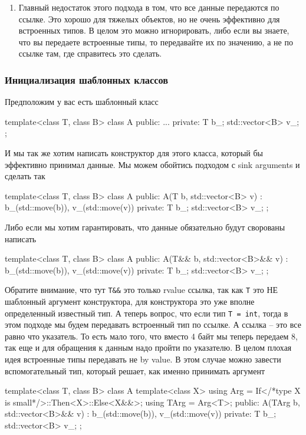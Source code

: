 \begin{enumerate}
\item Главный недостаток этого подхода в том, что все данные передаются по ссылке.
Это хорошо для тяжелых объектов, но не очень эффективно для встроенных типов.
В целом это можно игнорировать, либо если вы знаете, что вы передаете встроенные типы, то передавайте их по значению, а не по ссылке там, где справитесь это сделать.
\end{enumerate}


\subsubsection{Инициализация шаблонных классов}

Предположим у вас есть шаблонный класс
\begin{cppcode}
template<class T, class B>
class A {
public:
  ...
private:
  T b_;
  std::vector<B> v_;
};
\end{cppcode}
И мы так же хотим написать конструктор для этого класса, который бы эффективно принимал данные.
Мы можем обойтись подходом с sink arguments и сделать так
\begin{cppcode}
template<class T, class B>
class A {
public:
  A(T b, std::vector<B> v)
   : b_(std::move(b)), v_(std::move(v)) {}
private:
  T b_;
  std::vector<B> v_;
};
\end{cppcode}
Либо если мы хотим гарантировать, что данные обязательно будут сворованы написать
\begin{cppcode}
template<class T, class B>
class A {
public:
  A(T&& b, std::vector<B>&& v)
   : b_(std::move(b)), v_(std::move(v)) {}
private:
  T b_;
  std::vector<B> v_;
};
\end{cppcode}
Обратите внимание, что тут \verb"T&&" это только rvalue ссылка, так как \verb"T" это НЕ шаблонный аргумент конструктора, для конструктора это уже вполне определенный известный тип.
А теперь вопрос, что если тип \verb"T = int", тогда в этом подходе мы будем передавать встроенный тип по ссылке.
А ссылка -- это все равно что указатель.
То есть мало того, что вместо 4 байт мы теперь передаем 8, так еще и для обращения к данным надо пройти по указателю.
В целом плохая идея встроенные типы передавать не by value.
В этом случае можно завести вспомогательный тип, который решает, как именно принимать аргумент
\begin{cppcode}
template<class T, class B>
class A {
  template<class X>
  using Arg = If</*type X is small*/>::Then<X>::Else<X&&>;
  using TArg = Arg<T>;
public:
  A(TArg b, std::vector<B>&& v)
   : b_(std::move(b)), v_(std::move(v)) {}
private:
  T b_;
  std::vector<B> v_;
};
\end{cppcode}
